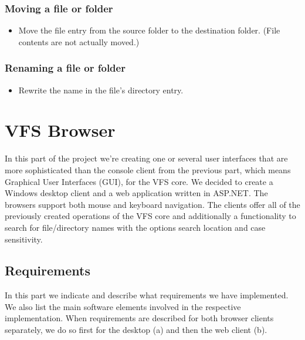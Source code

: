 \documentclass[a4paper,12pt]{article}
\begin{document}
\subsubsection{Moving a file or folder}\label{moving-a-file-or-folder}
    \begin{itemize}
        \itemsep1pt\parskip0pt
        \item{Move the file entry from the source folder to the destination folder. (File contents are not actually moved.)}
    \end{itemize}

\subsubsection{Renaming a file or folder}\label{renaming-a-file-or-folder}
    \begin{itemize}
        \itemsep1pt\parskip0pt
        \item{Rewrite the name in the file's directory entry.}
    \end{itemize}



\section{VFS Browser}
In this part of the project we're creating one or several user interfaces that are more sophisticated than the console client from the previous part, which means Graphical User Interfaces (GUI), for the VFS core. We decided to create a Windows desktop client and a web application written in ASP.NET. The browsers support both mouse and keyboard navigation. \newline
The clients offer all of the previously created operations of the VFS core and additionally a functionality to search for file/directory names with the options search location and case sensitivity.


\subsection{Requirements}
In this part we indicate and describe what requirements we have implemented. We also list the main software elements involved in the respective implementation. When requirements are described for both browser clients separately, we do so first for the desktop (a) and then the web client (b).
\end{document}

